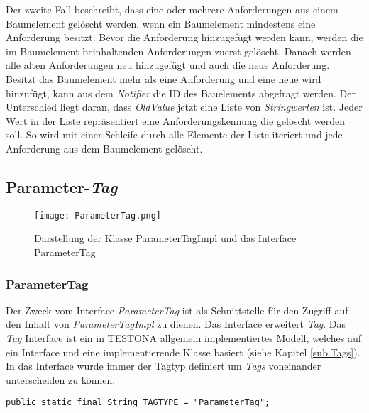 Der zweite Fall beschreibt, dass eine oder mehrere Anforderungen aus einem Baumelement gelöscht werden, wenn ein Baumelement mindestens eine Anforderung besitzt. Bevor die Anforderung hinzugefügt werden kann, werden die im Baumelement beinhaltenden Anforderungen zuerst gelöscht. Danach werden alle alten Anforderungen neu hinzugefügt und auch die neue Anforderung.\\


Besitzt das Baumelement mehr als eine Anforderung und eine neue wird hinzufügt, kann aus dem \textit{Notifier} die ID des Bauelements abgefragt werden. Der Unterschied liegt daran, dass \textit{OldValue} jetzt eine Liste von \textit{Stringwerten} ist. Jeder Wert in der Liste repräsentiert eine Anforderungskennung die gelöscht werden soll. So wird mit einer Schleife durch alle Elemente der Liste iteriert und jede Anforderung aus dem Baumelement gelöscht.\\



\subsection{Parameter-\textit{Tag}}\label{sub.ParameterTag}


\begin{figure}[h!]
  \begin{center}
    \texttt{[image: ParameterTag.png]}
  		  \caption{Darstellung der Klasse ParameterTagImpl und das Interface ParameterTag}
     \label{uml.ParameterTag}
  \end{center}
\end{figure}


\subsubsection{ParameterTag}
Der Zweck vom Interface \textit{ParameterTag} ist als Schnittstelle für den Zugriff auf den Inhalt von \textit{ParameterTagImpl} zu dienen. Das Interface erweitert \textit{Tag}. Das \textit{Tag} Interface ist ein in TESTONA allgemein implementiertes Modell, welches auf ein Interface und eine implementierende Klasse basiert (siehe Kapitel \ref{sub.Tags}). In das Interface wurde immer der Tagtyp definiert um \textit{Tags} voneinander unterscheiden zu können.

\begin{lstlisting}
public static final String TAGTYPE = "ParameterTag";
\end{lstlisting}

